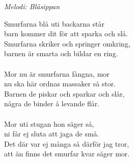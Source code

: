 {\footnotesize\textit{Melodi: Blåsippan}}\par
\vspace{10pt}
Smurfarna blå uti backarna står\\
barn kommer dit för att sparka och slå.\\
Smurfarna skriker och springer omkring,\\
barnen är smarta och bildar en ring.\\
\\
Mor nu är smurfarna fångna, mor\\
nu ska här ordnas massaker så stor.\\
Barnen de piskar och sparkar och slår,\\
några de binder å levande flår.\\
\\
Mor uti stugan hon säger så,\\
ni får ej sluta att jaga de små.\\
Det där var ej många så därför jag tror,\\
att än finns det smurfar kvar säger mor.
